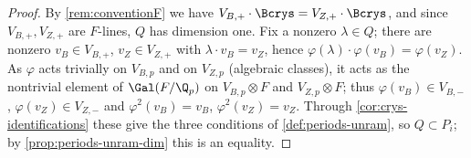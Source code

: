 \begin{proof}
  By \cref{rem:conventionF} we have \(V_{B,+} \cdot \Bcrys = V_{Z,+} \cdot \Bcrys\),
  and since \(V_{B,+}, V_{Z,+}\) are \(F\)-lines, \(Q\) has dimension one. Fix a
  nonzero \(\lambda \in Q\); there are nonzero \(v_B \in V_{B,+}\),
  \(v_Z \in V_{Z,+}\) with \(\lambda \cdot v_B = v_Z\), hence
  \(\varphi(\lambda) \cdot \varphi(v_B) = \varphi(v_Z)\). As \(\varphi\) acts
  trivially on \(V_{B,p}\) and on \(V_{Z,p}\) (algebraic classes), it acts as the
  nontrivial element of \(\Gal(F/\Q_p)\) on \(V_{B,p} \otimes F\) and
  \(V_{Z,p} \otimes F\); thus \(\varphi(v_B) \in V_{B,-}\),
  \(\varphi(v_Z) \in V_{Z,-}\) and \(\varphi^2(v_B) = v_B\),
  \(\varphi^2(v_Z) = v_Z\). Through \cref{cor:crys-identifications} these give
  the three conditions of \cref{def:periods-unram}, so \(Q \subset P_i\); by
  \cref{prop:periods-unram-dim} this is an equality.
\end{proof}

